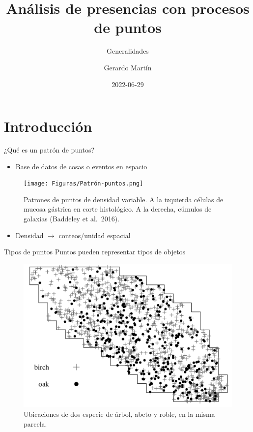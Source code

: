 \documentclass[
  11pt,
  ignorenonframetext,
]{beamer}
\title{Análisis de presencias con procesos de puntos}
\subtitle{Generalidades}
\author{Gerardo Martín}
\date{2022-06-29}
\providecommand{\tightlist}{%
  \setlength{\itemsep}{0pt}\setlength{\parskip}{0pt}}
\begin{document}
\frame{\titlepage}

\hypertarget{introducciuxf3n}{%
\section{Introducción}\label{introducciuxf3n}}

\begin{frame}{¿Qué es un patrón de puntos?}
\protect\hypertarget{quuxe9-es-un-patruxf3n-de-puntos}{}
\begin{itemize}
\tightlist
\item
  Base de datos de cosas o eventos en espacio
\end{itemize}

\begin{figure}
\centering
\texttt{[image: Figuras/Patrón-puntos.png]}
\caption{Patrones de puntos de densidad variable. A la izquierda células
de mucosa gástrica en corte histológico. A la derecha, cúmulos de
galaxias (Baddeley et al.~2016).}
\end{figure}

\begin{itemize}
\tightlist
\item
  Densidad \(\rightarrow\) conteos/unidad espacial
\end{itemize}
\end{frame}

\begin{frame}{Tipos de puntos}
\protect\hypertarget{tipos-de-puntos}{}
Puntos pueden representar tipos de objetos

\begin{figure}
\centering
\includegraphics{Figuras/Tipos-puntos.png}
\caption{Ubicaciones de dos especie de árbol, abeto y roble, en la misma
parcela.}
\end{figure}
\end{frame}
\end{document}
